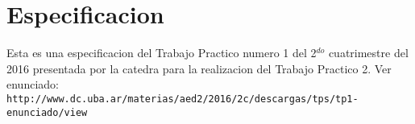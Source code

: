 \documentclass[10pt, a4paper]{article}
\begin{document}
{} %


\maketitle

\tableofcontents

\pagebreak


\section{Especificacion}
Esta es una especificacion del Trabajo Practico numero 1 del 2$^{do}$ cuatrimestre del 2016 presentada por la catedra para la realizacion del Trabajo Practico 2. Ver enunciado:\\
\verb+http://www.dc.uba.ar/materias/aed2/2016/2c/descargas/tps/tp1-enunciado/view+\\




\end{document}
